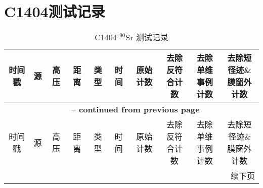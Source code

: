 \section{C1404测试记录}
\begin{center}
{ \tabcolsep=3pt
\begin{longtable}{c c c c c c c c c c}
    \caption{C1404 $\mathrm{^{90}Sr}$ 测试记录}
    \label{tab:sep_C1404_Sr90} \\
    \toprule
    时间戳  &   源  &   高压    &   距离    &   类型    &   时间    &   原始计数    &   \makecell[c]{去除反符\\合计数}  &   \makecell[c]{去除单维\\事例计数}    &   \makecell[c]{去除短径迹\& \\ 膜窗外计数}  \\
    \midrule
    \endfirsthead

    \multicolumn{10}{c}{{\bfseries \tablename\ \thetable{} -- continued from previous page}} \\
    \toprule
    时间戳  &   源  &   高压    &   距离    &   类型    &   时间    &   原始计数    &   \makecell[c]{去除反符\\合计数}  &   \makecell[c]{去除单维\\事例计数}    &   \makecell[c]{去除短径迹\& \\ 膜窗外计数}  \\
    \midrule
    \endhead

    \bottomrule
    \multicolumn{10}{r}{续下页}
    \endfoot

    \bottomrule
    \endlastfoot


\end{longtable}}
\end{center}
